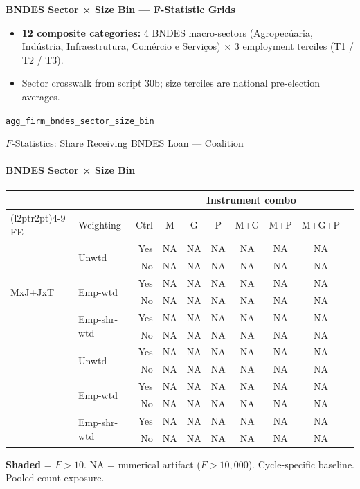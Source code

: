 \documentclass[aspectratio=169,10pt]{beamer}
\begin{document}
\begin{frame}[plain]
\begin{center}
{\Large\textbf{BNDES Sector × Size Bin --- F-Statistic Grids}}\\[0.5em]
\end{center}
\small
\begin{itemize}
\item \textbf{12 composite categories:} 4 BNDES macro-sectors (Agropec\'{u}aria, Ind\'{u}stria, Infraestrutura, Com\'{e}rcio e Servi\c{c}os) $\times$ 3 employment terciles (T1 / T2 / T3).
\item Sector crosswalk from script 30b; size terciles are national pre-election averages.
\end{itemize}
\vfill
\begin{center}
{\scriptsize \texttt{agg\_firm\_bndes\_sector\_size\_bin}}
\end{center}
\end{frame}

\begin{frame}[t]{$F$-Statistics: Share Receiving BNDES Loan --- Coalition}
\framesubtitle{BNDES Sector × Size Bin}
\begin{center}
\footnotesize
\setlength{\tabcolsep}{3.5pt}
\renewcommand{\arraystretch}{1.05}
\begin{tabular}{@{}llrccccccc@{}}
\toprule
 & & & \multicolumn{6}{c}{Instrument combo} \\
\cmidrule(l{2pt}r{2pt}){4-9}
FE & Weighting & Ctrl & M & G & P & M+G & M+P & M+G+P \\
\midrule
  \multirow{6}{*}{MxJ+JxT} & \multirow{2}{*}{Unwtd} & Yes & NA & NA & NA & NA & NA & NA \\
   &  & No & NA & NA & NA & NA & NA & NA \\
   & \multirow{2}{*}{Emp-wtd} & Yes & NA & NA & NA & NA & NA & NA \\
   &  & No & NA & NA & NA & NA & NA & NA \\
   & \multirow{2}{*}{Emp-shr-wtd} & Yes & NA & NA & NA & NA & NA & NA \\
   &  & No & NA & NA & NA & NA & NA & NA \\
\addlinespace[5pt]
  \multirow{6}{*}{MxJ+MxT} & \multirow{2}{*}{Unwtd} & Yes & NA & NA & NA & NA & NA & NA \\
   &  & No & NA & NA & NA & NA & NA & NA \\
   & \multirow{2}{*}{Emp-wtd} & Yes & NA & NA & NA & NA & NA & NA \\
   &  & No & NA & NA & NA & NA & NA & NA \\
   & \multirow{2}{*}{Emp-shr-wtd} & Yes & NA & NA & NA & NA & NA & NA \\
   &  & No & NA & NA & NA & NA & NA & NA \\
\bottomrule
\end{tabular}
\end{center}
{\scriptsize \colorbox{pass}{\textbf{Shaded}} = $F>10$. NA = numerical artifact ($F>10{,}000$). Cycle-specific baseline. Pooled-count exposure.}
\end{frame}
\end{document}
